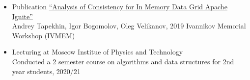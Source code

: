 \begin{itemize}
    \item Publication \href{https://ieeexplore.ieee.org/document/8880744}{``Analysis of Consistency for In Memory Data Grid Apache Ignite''} \\
    Andrey Tapekhin, Igor Bogomolov, Oleg Velikanov, 2019 Ivannikov Memorial Workshop (IVMEM)
    
    \item Lecturing at Moscow Institue of Physics and Technology \\
    Conducted a 2 semester course on algorithms and data structures for 2nd year students, 2020/21
\end{itemize}

